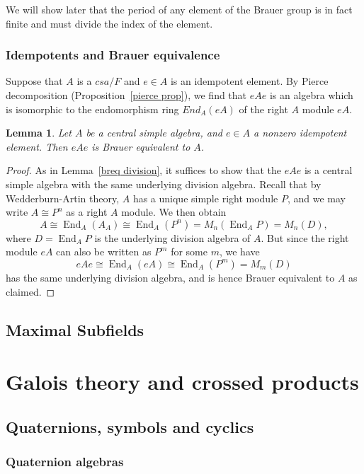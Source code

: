 \documentclass[12pt]{report}
\theoremstyle{plain}
\newtheorem{lem}[thm]{Lemma}
\newcommand{\oper}[1]{\operatorname{#1}}
\newcommand{\End}{\oper{End}}
\begin{document}
We will show later that the period of any element of the Brauer group is in
fact finite and must divide the index of the element.

\subsection{Idempotents and Brauer equivalence}

Suppose that $A$ is a $csa/F$ and $e \in A$ is an idempotent element. By
Pierce decomposition (Proposition~\ref{pierce prop}), we find that $eAe$ is
an algebra which is isomorphic to the endomorphism ring $End_A(eA)$ of the
right $A$ module $eA$.

\begin{lem}
Let $A$ be a central simple algebra, and $e \in A$ a nonzero idempotent
element. Then $eAe$ is Brauer equivalent to $A$.
\end{lem}
\begin{proof}
As in Lemma~\ref{breq division}, it suffices to show that the $eAe$ is a
central simple algebra with the same underlying division algebra. Recall
that by Wedderburn-Artin theory, $A$ has a unique simple right module $P$,
and we may write $A \cong P^n$ as a right $A$ module. We then obtain
\[A \cong \End_{A}(A_A) \cong \End_A(P^n) = M_n(\End_A P) = M_n(D),\]
where $D = \End_A P$ is the underlying division algebra of $A$. But since
the right module $eA$ can also be written as $P^m$ for some $m$, we have
\[eAe \cong \End_A(eA) \cong \End_A(P^m) = M_m(D)\]
has the same underlying division algebra, and is hence Brauer equivalent to
$A$ as claimed.
\end{proof}

\section{Maximal Subfields}

\chapter{Galois theory and crossed products}

\section{Quaternions, symbols and cyclics}
\subsection{Quaternion algebras}
\end{document}
